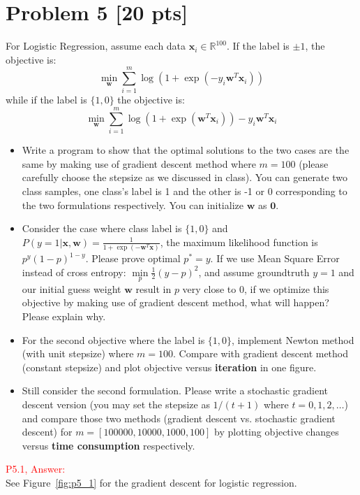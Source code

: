 \documentclass[11pt]{article}
\newcommand{\R}{\mathbb{R}}
\newcommand{\vct}[1]{\mathbf{#1}}
\def \vzero    {\vct{0}}
\def \vw {\vct{w}}
\def \vx {\vct{x}}
\def \R {\mathbb{R}}
\begin{document}
\section*{Problem 5 [20 pts]}
For Logistic Regression, assume each data $\vx_i\in\R^{100}$. If the label is $\pm1$,  the objective is:
\begin{equation}
\min_\vw	\sum_{i=1}^{m}\log(1+\exp(-y_i\vw^T\vx_i))
\end{equation}
while if the label is $\{1,0\}$ the objective is:
\begin{equation}
	\min_\vw	\sum_{i=1}^{m}\log(1+\exp(\vw^T\vx_i))-y_i\vw^T\vx_i
\end{equation}
\begin{itemize}
	\item Write a program to show that the optimal solutions to the two cases  are the same by making use of gradient descent method where $m=100$ (please carefully choose the stepsize as we discussed in class). You can generate two class samples, one class's label is 1 and the other is -1 or 0 corresponding to the two formulations respectively. You can initialize $\vw$ as $\vzero$.
	\item Consider the case where class label is $\{1,0\}$ and $P(y=1|\vx,\vw)=\frac{1}{1+\exp(-\vw^T\vx)}$, the maximum likelihood function is $p^y(1-p)^{1-y}$. Please prove optimal $p^*=y$. If we use Mean Square Error instead of cross entropy: $\min\limits_p \frac{1}{2}(y-p)^2$, and assume groundtruth $y=1$ and our initial guess weight $\vw$ result in $p$ very close to 0, if we optimize this objective by making use of gradient descent method, what will happen? Please explain why.
	\item For the second objective where the label is $\{1,0\}$, implement Newton method (with unit stepsize) where $m=100$.  Compare with gradient descent method (constant stepsize) and plot objective versus \textbf{iteration} in one figure.
	\item Still consider the second formulation. Please write a stochastic gradient descent version (you may set the stepsize as $1/(t+1)$ where $t=0,1,2,\dots$) and compare those two methods (gradient descent vs. stochastic gradient descent) for $m=[100000,10000,1000,100]$ by plotting objective changes versus \textbf{time consumption} respectively.
\end{itemize}

\textcolor{red}{P5.1, Answer:}\\

See Figure~\ref{fig:p5_1} for the gradient descent for logistic regression.\\
\end{document}
